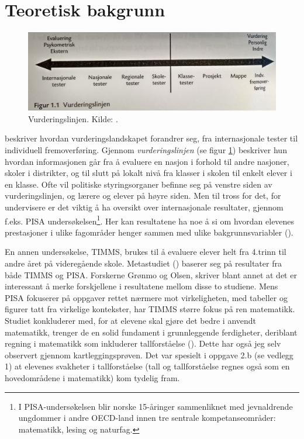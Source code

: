 \documentclass[main.tex]{subfiles}
\begin{document}
\section*{Teoretisk bakgrunn}

\begin{figure}[h!]
\centering
\includegraphics[scale = 0.1]{../figures/vurderingslinjen.png}
\caption{Vurderingslinjen. Kilde: \protect{}.}
\label{fig:smit09}
\end{figure}

 beskriver hvordan vurderingslandskapet forandrer seg, fra internasjonale tester til
individuell fremoverføring. Gjennom \emph{vurderingslinjen} (se figur \ref{fig:smit09}) beskriver hun
hvordan informasjonen går fra å evaluere en nasjon i forhold til andre nasjoner, skoler i distrikter, 
og til slutt på lokalt nivå fra klasser i skolen til enkelt elever i en klasse. Ofte vil politiske styringsorganer
befinne seg på venstre siden av vurderingslinjen, og lærere og elever på høyre siden. Men til tross for det, 
for undervisere er det viktig å ha oversikt over internasjonale resultater, gjennom f.eks. PISA 
undersøkelsen\footnote{I  PISA-undersøkelsen blir norske 15-åringer sammenliknet med jevnaldrende ungdommer i 
andre OECD-land innen tre sentrale kompetanseområder: matematikk, lesing og naturfag.}. 
Her kan resultatene ha noe å si om hvordan elevenes prestasjoner i ulike fagområder henger sammen med ulike 
bakgrunnsvariabler (). 

En annen undersøkelse, TIMMS, brukes til å evaluere elever helt fra 4.trinn
til andre året på videregående skole. Metastudiet () baserer seg på resultater fra både TIMMS og PISA. 
Forskerne Grønmo og Olsen, skriver blant annet at det er interessant å merke forskjellene i resultatene mellom disse to 
studiene. Mens PISA fokuserer på oppgaver rettet nærmere mot virkeligheten, med tabeller og figurer tatt fra virkelige
kontekster, har TIMMS større fokus på ren matematikk. Studiet konkluderer med, for at elevene skal gjøre det bedre
i anvendt matematikk, trenger de en solid fundament i grunnleggende ferdigheter, deriblant regning i matematikk som
inkluderer tallforståelse (). Dette har også jeg selv observert gjennom kartleggingsprøven. Det var 
spesielt i oppgave 2.b (se vedlegg 1) at elevenes svakheter i tallforståelse (tall og tallforståelse regnes også
som en hovedområdene i matematikk) kom tydelig fram.
\end{document}
